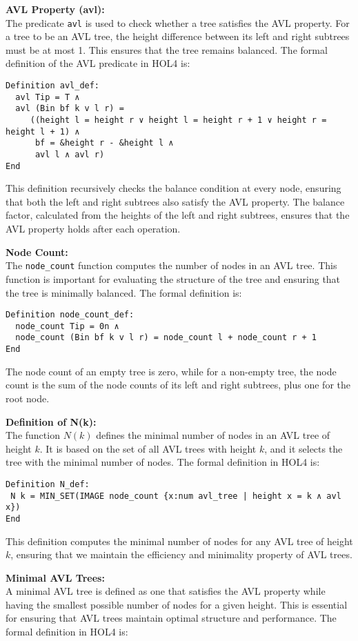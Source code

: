 \documentclass[12pt]{article}
\begin{document}
\textbf{AVL Property (avl):} \\
The predicate \texttt{avl} is used to check whether a tree satisfies the AVL property. For a tree to be an AVL tree, the height difference between its left and right subtrees must be at most 1. This ensures that the tree remains balanced. The formal definition of the AVL predicate in HOL4 is:
\begin{verbatim}
Definition avl_def:
  avl Tip = T ∧
  avl (Bin bf k v l r) =
     ((height l = height r ∨ height l = height r + 1 ∨ height r = height l + 1) ∧
      bf = &height r - &height l ∧
      avl l ∧ avl r)
End        
\end{verbatim}
This definition recursively checks the balance condition at every node, ensuring that both the left and right subtrees also satisfy the AVL property. The balance factor, calculated from the heights of the left and right subtrees, ensures that the AVL property holds after each operation.

\textbf{Node Count:} \\
The \texttt{node\_count} function computes the number of nodes in an AVL tree. This function is important for evaluating the structure of the tree and ensuring that the tree is minimally balanced. The formal definition is:
\begin{verbatim}
Definition node_count_def:
  node_count Tip = 0n ∧
  node_count (Bin bf k v l r) = node_count l + node_count r + 1
End    
\end{verbatim}
The node count of an empty tree is zero, while for a non-empty tree, the node count is the sum of the node counts of its left and right subtrees, plus one for the root node.

\textbf{Definition of N(k):} \\
The function $N(k)$ defines the minimal number of nodes in an AVL tree of height $k$. It is based on the set of all AVL trees with height $k$, and it selects the tree with the minimal number of nodes. The formal definition in HOL4 is:
\begin{verbatim}
Definition N_def:
 N k = MIN_SET(IMAGE node_count {x:num avl_tree | height x = k ∧ avl x})
End
\end{verbatim}

This definition computes the minimal number of nodes for any AVL tree of height \( k \), ensuring that we maintain the efficiency and minimality property of AVL trees.

\textbf{Minimal AVL Trees:} \\
A minimal AVL tree is defined as one that satisfies the AVL property while having the smallest possible number of nodes for a given height. This is essential for ensuring that AVL trees maintain optimal structure and performance. The formal definition in HOL4 is:
\end{document}
